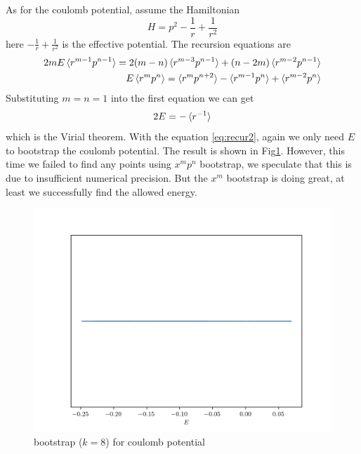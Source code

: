 \documentclass[aps, preprint,amsmath, amssymb]{revtex4-2}
\begin{document}
As for the coulomb potential, assume the Hamiltonian
\begin{equation}
	H = p^2 - \frac1r + \frac1{r^2}
\end{equation}
here $- \frac1r + \frac1{r^2}$ is the effective potential. The recursion equations are
\begin{align}
	2mE\braket{r^{m - 1} p^{n - 1}} = 2(m - n)\braket{r^{m - 3} p^{n - 1}} + (n - 2m)\braket{r^{m - 2} p^{n - 1}} \notag \\
	E\braket{r^m p^n} = \braket{r^m p^{n + 2}} - \braket{r^{m - 1} p^n} + \braket{r^{m - 2} p^n}
\end{align}
Substituting $m = n = 1$ into the first equation we can get
\begin{equation}
	2E = -\braket{r^{-1}}
\end{equation}
which is the Virial theorem. With the equation \eqref{eq:recur2}, again we only need $E$ to bootstrap the coulomb potential. The result is shown in Fig\ref{fig:coulomb}. However, this time we failed to find any points using $x^m p^n$ bootstrap, we speculate that this is due to insufficient numerical precision. But the $x^m$ bootstrap is doing great, at least we successfully find the allowed energy.
\begin{figure}
	\includegraphics[width=0.8\linewidth]{coulomb.png}
    \caption{  bootstrap ($k = 8$) for coulomb potential}
	\label{fig:coulomb}
\end{figure}
\end{document}
